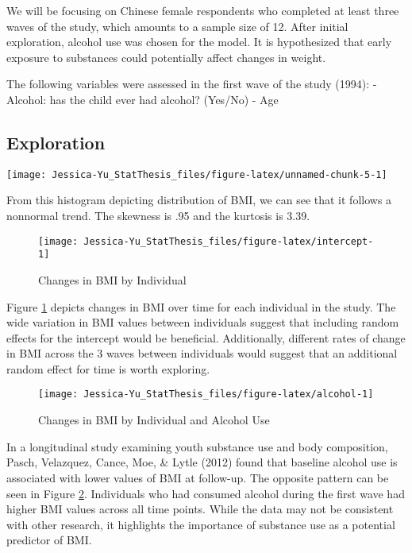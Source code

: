 \documentclass[12pt, twoside]{amherstthesis}
\begin{document}
We will be focusing on Chinese female respondents who completed at least three waves of the study, which amounts to a sample size of 12. After initial exploration, alcohol use was chosen for the model. It is hypothesized that early exposure to substances could potentially affect changes in weight.

The following variables were assessed in the first wave of the study (1994):
- Alcohol: has the child ever had alcohol? (Yes/No)
- Age

\hypertarget{exploration}{%
\subsection{Exploration}\label{exploration}}
\begin{center}\texttt{[image: Jessica-Yu\_StatThesis\_files/figure-latex/unnamed-chunk-5-1]} \end{center}

From this histogram depicting distribution of BMI, we can see that it follows a nonnormal trend. The skewness is .95 and the kurtosis is 3.39.
\begin{figure}

{\centering \texttt{[image: Jessica-Yu\_StatThesis\_files/figure-latex/intercept-1]} 

}

\caption{Changes in BMI by Individual}\label{fig:intercept}
\end{figure}
Figure \ref{fig:intercept} depicts changes in BMI over time for each individual in the study. The wide variation in BMI values between individuals suggest that including random effects for the intercept would be beneficial. Additionally, different rates of change in BMI across the 3 waves between individuals would suggest that an additional random effect for time is worth exploring.
\begin{figure}

{\centering \texttt{[image: Jessica-Yu\_StatThesis\_files/figure-latex/alcohol-1]} 

}

\caption{Changes in BMI by Individual and Alcohol Use}\label{fig:alcohol}
\end{figure}
In a longitudinal study examining youth substance use and body composition, Pasch, Velazquez, Cance, Moe, \& Lytle (2012) found that baseline alcohol use is associated with lower values of BMI at follow-up. The opposite pattern can be seen in Figure \ref{fig:alcohol}. Individuals who had consumed alcohol during the first wave had higher BMI values across all time points. While the data may not be consistent with other research, it highlights the importance of substance use as a potential predictor of BMI.
\end{document}
